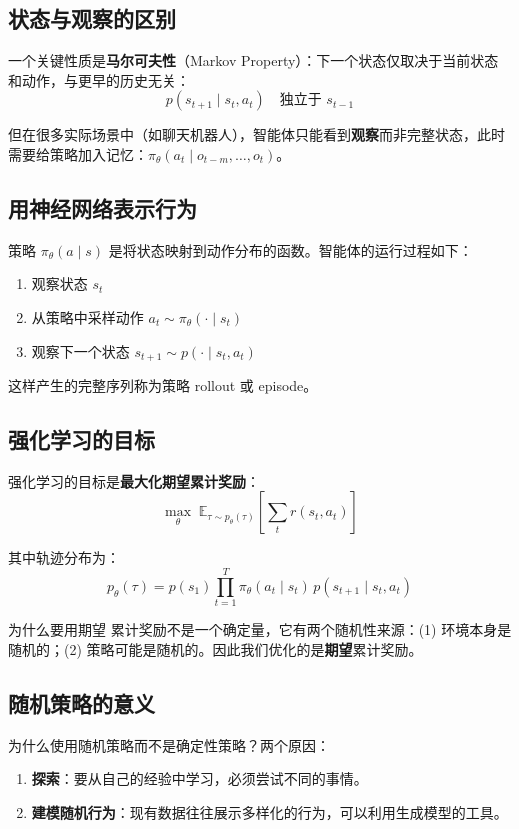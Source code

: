 \documentclass[a4paper]{article}
\begin{document}
\subsection{状态与观察的区别}

一个关键性质是\textbf{马尔可夫性}（Markov Property）：下一个状态仅取决于当前状态和动作，与更早的历史无关：
$$p(s_{t+1} \mid s_t, a_t) \quad \text{独立于 } s_{t-1}$$

但在很多实际场景中（如聊天机器人），智能体只能看到\textbf{观察}而非完整状态，此时需要给策略加入记忆：$\pi_\theta(a_t \mid o_{t-m}, \ldots, o_t)$。

\subsection{用神经网络表示行为}

策略 $\pi_\theta(a \mid s)$ 是将状态映射到动作分布的函数。智能体的运行过程如下：
\begin{enumerate}
    \item 观察状态 $s_t$
    \item 从策略中采样动作 $a_t \sim \pi_\theta(\cdot \mid s_t)$
    \item 观察下一个状态 $s_{t+1} \sim p(\cdot \mid s_t, a_t)$
\end{enumerate}
这样产生的完整序列称为策略 rollout 或 episode。

\subsection{强化学习的目标}

强化学习的目标是\textbf{最大化期望累计奖励}：
$$\max_\theta \; \mathbb{E}_{\tau \sim p_\theta(\tau)} \left[ \sum_{t} r(s_t, a_t) \right]$$

其中轨迹分布为：
$$p_\theta(\tau) = p(s_1) \prod_{t=1}^{T} \pi_\theta(a_t \mid s_t) \, p(s_{t+1} \mid s_t, a_t)$$

\begin{warningbox}{为什么要用期望}
累计奖励不是一个确定量，它有两个随机性来源：(1) 环境本身是随机的；(2) 策略可能是随机的。因此我们优化的是\textbf{期望}累计奖励。
\end{warningbox}

\subsection{随机策略的意义}

为什么使用随机策略而不是确定性策略？两个原因：
\begin{enumerate}
    \item \textbf{探索}：要从自己的经验中学习，必须尝试不同的事情。
    \item \textbf{建模随机行为}：现有数据往往展示多样化的行为，可以利用生成模型的工具。
\end{enumerate}
\end{document}

